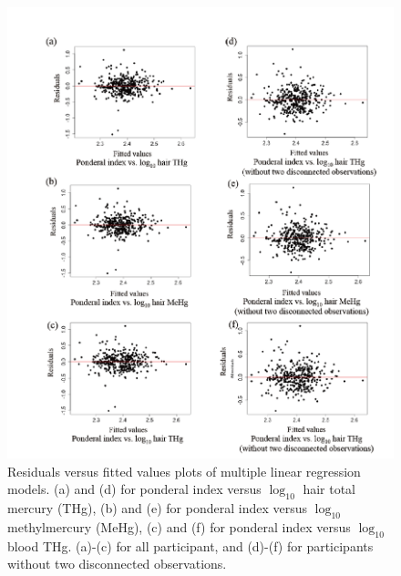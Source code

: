 \begin{figure}
  \centering
    \label{fig:Fig323}
  \includegraphics[scale=1]{Figures/Fig323.pdf}
  \caption[Residuals versus fitted values plots of multiple linear regression models]{Residuals versus fitted values plots of multiple linear regression models. (a) and (d) for ponderal index versus $\log_{10}$ hair total mercury (THg), (b) and (e) for ponderal index versus $\log_{10}$ methylmercury (MeHg), (c) and (f) for ponderal index versus $\log_{10}$ blood THg. (a)-(c) for all participant, and (d)-(f) for participants without two disconnected observations.}
\end{figure}


